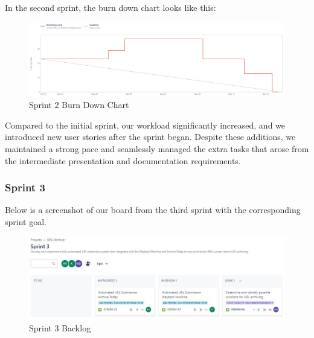In the second sprint, the burn down chart looks like this:
\begin{figure}[h!]
    \centering
    \includegraphics[width=1\textwidth]{pictures/Scrum/Sprint 2/Sprint2_burndownchart}
    \caption{Sprint 2 Burn Down Chart}
    \label{fig:sprint_2_bunrdown_chart}
\end{figure}

Compared to the initial sprint, our workload significantly increased, and we introduced new user stories after the sprint began.
Despite these additions, we maintained a strong pace and seamlessly managed the extra tasks that arose from the intermediate presentation and documentation requirements.
\clearpage


\subsubsection{Sprint 3}
Below is a screenshot of our board from the third sprint with the corresponding sprint goal.
\begin{figure}[h!]
    \centering
    \includegraphics[width=1\textwidth]{pictures/Scrum/Sprint 3/Sprint3_Backlog}
    \caption{Sprint 3 Backlog}
    \label{fig:sprint_3_backlog}
\end{figure}

